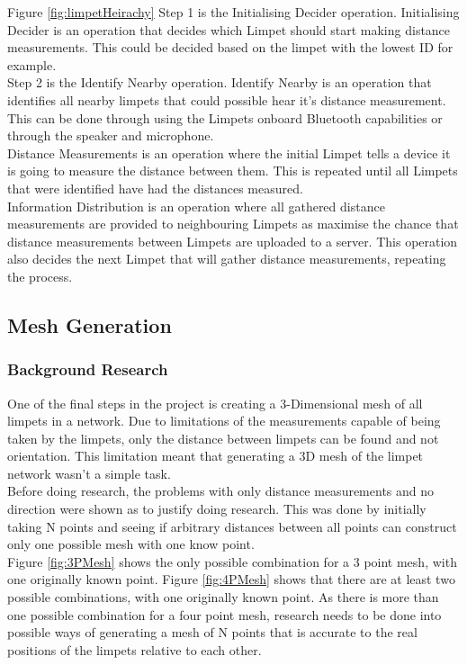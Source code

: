 Figure \ref{fig:limpetHeirachy} Step 1 is the Initialising Decider operation. Initialising Decider is an operation that decides which Limpet should start making distance measurements. This could be decided based on the limpet with the lowest ID for example.\\

Step 2 is the Identify Nearby operation. Identify Nearby is an operation that identifies all nearby limpets that could possible hear it's distance measurement. This can be done through using the Limpets onboard Bluetooth capabilities or through the speaker and microphone.\\

Distance Measurements is an operation where the initial Limpet tells a device it is going to measure the distance between them. This is repeated until all Limpets that were identified have had the distances measured.\\

Information Distribution is an operation where all gathered distance measurements are provided to neighbouring Limpets as maximise the chance that distance measurements between Limpets are uploaded to a server. This operation also decides the next Limpet that will gather distance measurements, repeating the process.

\subsection{Mesh Generation}
\subsubsection{Background Research}
One of the final steps in the project is creating a 3-Dimensional mesh of all limpets in a network. Due to limitations of the measurements capable of being taken by the limpets, only the distance between limpets can be found and not orientation. This limitation meant that generating a 3D mesh of the limpet network wasn't a simple task.\\

Before doing research, the problems with only distance measurements and no direction were shown as to justify doing research. This was done by initially taking N points and seeing if arbitrary distances between all points can construct only one possible mesh with one know point.\\

Figure \ref{fig:3PMesh} shows the only possible combination for a 3 point mesh, with one originally known point. Figure \ref{fig:4PMesh} shows that there are at least two possible combinations, with one originally known point. As there is more than one possible combination for a four point mesh, research needs to be done into possible ways of generating a mesh of N points that is accurate to the real positions of the limpets relative to each other.\\

